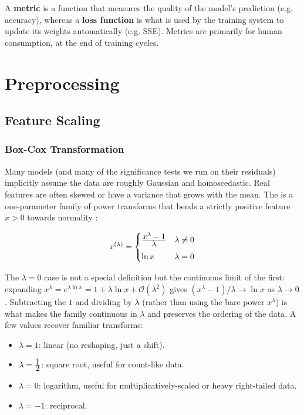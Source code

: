 A \textbf{metric} is a function that measures the quality of the model's prediction (e.g. accuracy), whereas a \textbf{loss function} is what is used by the training system to update its weights automatically (e.g. SSE). Metrics are primarily for human consumption, at the end of training cycles.

\section{Preprocessing}

\subsection{Feature Scaling}

\subsubsection{Box-Cox Transformation}

Many models (and many of the significance tests we run on their residuals) implicitly assume the data are roughly Gaussian and homoscedastic. Real features are often skewed or have a variance that grows with the mean. The  is a one-parameter family of power transforms that bends a strictly positive feature $x>0$ towards normality \cite{boxcox}:

\begin{align}\label{boxcox}
	x^{(\lambda)} = \begin{cases}
		\frac{\displaystyle x^\lambda - 1}{\displaystyle \lambda} & \lambda \ne 0 \\[1.5ex]
		\ln x & \lambda = 0
	\end{cases}
\end{align}

The $\lambda = 0$ case is not a special definition but the continuous limit of the first: expanding $x^\lambda = e^{\lambda \ln x} = 1 + \lambda \ln x + \mathcal{O}(\lambda^2)$ gives $(x^\lambda - 1)/\lambda \to \ln x$ as $\lambda \to 0$. Subtracting the $1$ and dividing by $\lambda$ (rather than using the bare power $x^\lambda$) is what makes the family continuous in $\lambda$ and preserves the ordering of the data. A few values recover familiar transforms:

\begin{itemize}
	\item $\lambda = 1$: linear (no reshaping, just a shift).
	\item $\lambda = \frac{\displaystyle 1}{\displaystyle 2}$: square root, useful for count-like data.
	\item $\lambda = 0$: logarithm, useful for multiplicatively-scaled or heavy right-tailed data.
	\item $\lambda = -1$: reciprocal.
\end{itemize}

